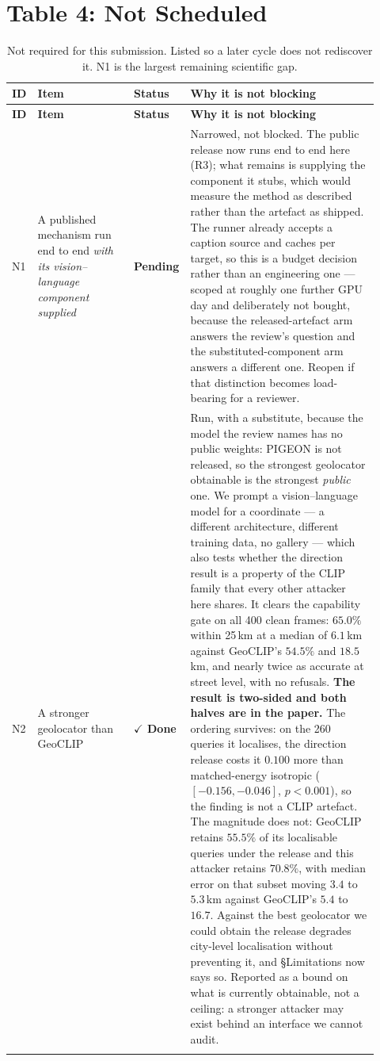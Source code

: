 \documentclass[11pt]{article}
\newcommand{\done}{\textcolor{DoneGreen}{\textbf{$\checkmark$ Done}}}
\newcommand{\pending}{\textcolor{PendRed}{\textbf{Pending}}}
\begin{document}
\section*{Table 4: Not Scheduled}

\begin{longtable}{@{}p{0.05\linewidth}p{0.26\linewidth}p{0.10\linewidth}p{0.51\linewidth}@{}}
\caption{Not required for this submission. Listed so a later cycle does not
rediscover it. N1 is the largest remaining scientific gap.}
\label{tab:tifs14-optional}\\
\toprule
\textbf{ID} & \textbf{Item} & \textbf{Status} & \textbf{Why it is not blocking} \\
\midrule
\endfirsthead
\toprule
\textbf{ID} & \textbf{Item} & \textbf{Status} & \textbf{Why it is not blocking} \\
\midrule
\endhead

N1 & A published mechanism run end to end \emph{with its vision--language
component supplied} & \pending & Narrowed, not blocked. The public release now
runs end to end here (R3); what remains is supplying the component it stubs,
which would measure the method as described rather than the artefact as
shipped. The runner already accepts a caption source and caches per target, so
this is a budget decision rather than an engineering one --- scoped at roughly
one further GPU day and deliberately not bought, because the released-artefact
arm answers the review's question and the substituted-component arm answers a
different one. Reopen if that distinction becomes load-bearing for a
reviewer. \\
\addlinespace

N2 & A stronger geolocator than GeoCLIP & \done & Run, with a substitute,
because the model the review names has no public weights: PIGEON is not
released, so the strongest geolocator obtainable is the strongest
\emph{public} one. We prompt a vision--language model for a coordinate --- a
different architecture, different training data, no gallery --- which also
tests whether the direction result is a property of the CLIP family that every
other attacker here shares. It clears the capability gate on all 400 clean
frames: $65.0\%$ within 25\,km at a median of $6.1$\,km against GeoCLIP's
$54.5\%$ and $18.5$\,km, and nearly twice as accurate at street level, with no
refusals. \textbf{The result is two-sided and both halves are in the paper.}
The ordering survives: on the 260 queries it localises, the direction release
costs it $0.100$ more than matched-energy isotropic ($[-0.156,-0.046]$,
$p<0.001$), so the finding is not a CLIP artefact. The magnitude does not:
GeoCLIP retains $55.5\%$ of its localisable queries under the release and this
attacker retains $70.8\%$, with median error on that subset moving $3.4$ to
$5.3$\,km against GeoCLIP's $5.4$ to $16.7$. Against the best geolocator we
could obtain the release degrades city-level localisation without preventing
it, and \S Limitations now says so. Reported as a bound on what is currently
obtainable, not a ceiling: a stronger attacker may exist behind an interface
we cannot audit. \\
\addlinespace


\end{longtable}
\end{document}
